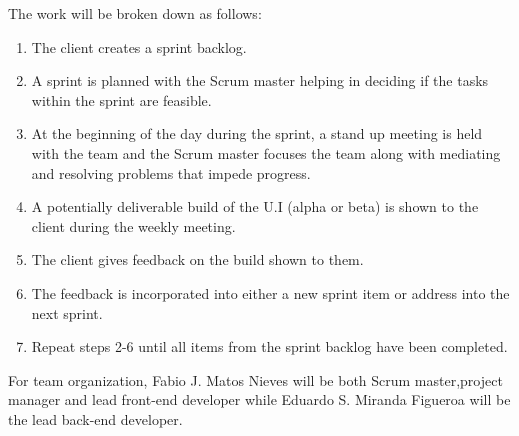  The work will be broken down as follows:
 \begin{enumerate}
 \item The client creates a sprint backlog.
 \item A sprint is planned with the Scrum master helping in deciding if the tasks within the sprint are feasible.
 \item At the beginning of the day during the sprint, a stand up meeting is held with the team and the Scrum master focuses the team along with mediating and resolving problems that impede progress.
 \item A potentially deliverable build of the U.I (alpha or beta) is shown to the client during the weekly meeting.
 \item The client gives feedback on the build shown to them.
 \item The feedback is incorporated into either a new sprint item or address into the next sprint.
 \item Repeat steps 2-6 until all items from the sprint backlog have been completed.
 \end{enumerate}
 For team organization, Fabio J. Matos Nieves will be both Scrum master,project manager and lead front-end developer while Eduardo S. Miranda Figueroa will be the lead back-end developer.
